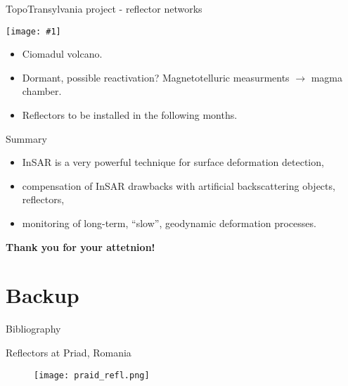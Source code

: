 \documentclass[aspectratio=169]{beamer}
\newcommand{\fig}[1]{
    \begin{mdframed}[linecolor=red!50!black, linewidth=2pt, roundcorner=2.25pt,
                     innerrightmargin=0pt, innerleftmargin=0pt,
                     innertopmargin=0pt, innerbottommargin=0pt,
                     backgroundcolor=white, frametitle={}, align=center]
        \texttt{[image: \#1]}
    \end{mdframed}
}
\begin{document}
\begin{frame}{TopoTransylvania project - reflector networks}
    \begin{minipage}[c]{0.425\textwidth}
        \fig{csomad_network_alpha.png}
    \end{minipage}
    \hspace{10pt}
    \begin{minipage}[c]{0.475\textwidth}
        \begin{itemize}
            \pause
            \item Ciomadul volcano.
            \pause
            \item Dormant, possible reactivation? Magnetotelluric measurments
                  $\rightarrow$ magma chamber.
            \pause
            \item Reflectors to be installed in the following months.
        \end{itemize}
    \end{minipage}
\end{frame}

\begin{frame}{Summary}
    \begin{itemize}
        \pause
        \item InSAR is a very powerful technique for surface deformation detection,
        \pause
        \item compensation of InSAR drawbacks with artificial backscattering objects, reflectors,
        \pause
        \item monitoring of long-term, ``slow'',  geodynamic deformation processes.
    \end{itemize}
\end{frame}

\begin{frame}
    \centering
    {\Huge \color{red!65!black} \textbf{Thank you for your attetnion!}}
\end{frame}

\backupbegin

\section*{Backup}

\begin{frame}{Bibliography}
    
        
\end{frame}

\begin{frame}{Reflectors at Priad, Romania}
    \begin{figure}[H]
        \centering
        \texttt{[image: praid\_refl.png]}
    \end{figure}
\end{frame}

\backupend
\end{document}
